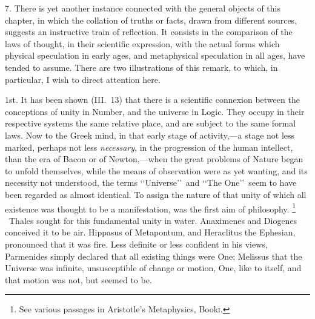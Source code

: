 \documentclass[oneside]{book}
\begin{document}
7. There is yet another instance connected with the general
objects of this chapter, in which the collation of truths or facts,
drawn from different sources, suggests an instructive train of reflection.
It consists in the comparison of the laws of thought, in
their scientific expression, with the actual forms which physical
speculation in early ages, and metaphysical speculation in all
ages, have tended to assume. There are two illustrations of this
remark, to which, in particular, I wish to direct attention here.

1st. It has been shown (III.~13) that there is a scientific
connexion between the conceptions of unity in Number, and the
universe in Logic. They occupy in their respective systems the
same relative place, and are subject to the same formal laws.
Now to the Greek mind, in that early stage of activity,---a stage
not less marked, perhaps not less \emph{necessary}, in the progression of
the human intellect, than the era of Bacon or of Newton,---when
the great problems of Nature began to unfold themselves, while
the means of observation were as yet wanting, and its necessity
not understood, the terms \lq\lq Universe\rq\rq\  and \lq\lq The One\rq\rq\  seem to
have been regarded as almost identical. To assign the nature of
that unity of which all existence was thought to be a manifestation, was the first aim of philosophy.%
\footnote{See various passages in Aristotle's Metaphysics, Book\textsc{i.}
}%
\ Thales sought for this
fundamental unity in water. Anaximenes and Diogenes conceived it to be air. Hippasus of Metapontum, and Heraclitus
the Ephesian, pronounced that it was fire. Less definite or
less confident in his views, Parmenides simply declared that all
existing things were One; Melissus that the Universe was infinite, unsusceptible of change or motion, One, like to itself, and
that motion was not, but seemed to be.%
\end{document}
